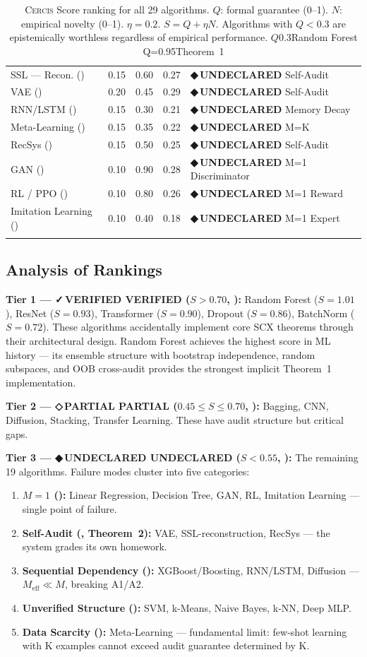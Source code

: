 \documentclass[12pt,a4paper]{article}
\theoremstyle{definition}
\newcommand{\guilty}{{\color{guiltycolor}\textbf{◆\,UNDECLARED}}}
\newcommand{\weakness}{{\color{weakcolor}\textbf{◇\,PARTIAL}}}
\newcommand{\verified}{{\color{verifiedcolor}\textbf{✓\,VERIFIED}}}
\newcommand{\Cercis}{\textsc{Cercis}}
\newcommand{\SCX}{\textsc{SCX}}
\begin{document}
\begin{longtable}{p{3.8cm} c c c p{2.5cm}}
SSL — Recon. () & 0.15 & 0.60 & 0.27 & \guilty{} Self-Audit \\
VAE () & 0.20 & 0.45 & 0.29 & \guilty{} Self-Audit \\
RNN/LSTM () & 0.15 & 0.30 & 0.21 & \guilty{} Memory Decay \\
Meta-Learning () & 0.15 & 0.35 & 0.22 & \guilty{} M=K \\
RecSys () & 0.15 & 0.50 & 0.25 & \guilty{} Self-Audit \\
GAN () & 0.10 & 0.90 & 0.28 & \guilty{} M=1 Discriminator \\
RL / PPO () & 0.10 & 0.80 & 0.26 & \guilty{} M=1 Reward \\
Imitation Learning () & 0.10 & 0.40 & 0.18 & \guilty{} M=1 Expert \\
\bottomrule
\caption{\Cercis{} Score ranking for all 29 algorithms. $Q$: formal guarantee (0--1). $N$: empirical novelty (0--1). $\eta=0.2$. $S=Q+\eta N$. Algorithms with $Q<0.3$ are epistemically worthless regardless of empirical performance. $Q$0.3Random Forest Q=0.95Theorem~1}
\label{tab:cercis_ranking}
\end{longtable}

\subsection{Analysis of Rankings }

\noindent\textbf{Tier 1 — \verified{} VERIFIED ($S > 0.70$, ):} Random Forest ($S=1.01$), ResNet ($S=0.93$), Transformer ($S=0.90$), Dropout ($S=0.86$), BatchNorm ($S=0.72$). These algorithms accidentally implement core \SCX{} theorems through their architectural design. Random Forest achieves the highest score in ML history — its ensemble structure with bootstrap independence, random subspaces, and OOB cross-audit provides the strongest implicit Theorem~1 implementation.

\noindent\textbf{Tier 2 — \weakness{} PARTIAL ($0.45 \le S \le 0.70$, ):} Bagging, CNN, Diffusion, Stacking, Transfer Learning. These have audit structure but critical gaps.

\noindent\textbf{Tier 3 — \guilty{} UNDECLARED ($S < 0.55$, ):} The remaining 19 algorithms. Failure modes cluster into five categories:
\begin{enumerate}[label=\textbf{Failure \arabic*:}, nosep]
    \item \textbf{$M=1$ ():} Linear Regression, Decision Tree, GAN, RL, Imitation Learning — single point of failure.
    \item \textbf{Self-Audit (, Theorem~2):} VAE, SSL-reconstruction, RecSys — the system grades its own homework.
    \item \textbf{Sequential Dependency ():} XGBoost/Boosting, RNN/LSTM, Diffusion — $M_{\text{eff}} \ll M$, breaking A1/A2.
    \item \textbf{Unverified Structure ():} SVM, k-Means, Naive Bayes, k-NN, Deep MLP.
    \item \textbf{Data Scarcity ():} Meta-Learning — fundamental limit: few-shot learning with K examples cannot exceed audit guarantee determined by K.
\end{enumerate}
\end{document}

